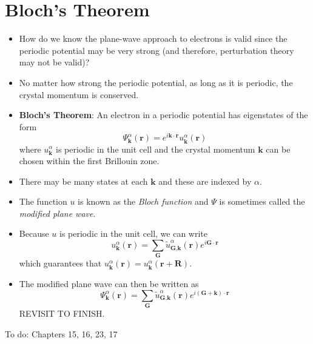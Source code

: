 \documentclass[10pt]{article}
\begin{document}
\section{Bloch's Theorem}
\begin{itemize}
  \item How do we know the plane-wave approach to electrons is valid since the periodic potential may be very strong (and
  therefore, perturbation theory may not be valid)?
  \item No matter how strong the periodic potential, as long as it is periodic, the crystal momentum is conserved.
  \item  \textbf{Bloch's Theorem}: An electron in a periodic potential has eigenstates of the form
  $$\Psi_{\textbf{k}}^{\alpha}(\textbf{r}) = e^{i\textbf{k}\cdot\textbf{r}}u_{\textbf{k}}^{\alpha}(\textbf{r})$$
  where $u_{\textbf{k}}^{\alpha}$ is periodic in the unit cell and the crystal momentum $\textbf{k}$ can be chosen
  within the first Brillouin zone.
  \item There may be many states at each $\textbf{k}$ and these are indexed by $\alpha$.
  \item The function $u$ is known as the \emph{Bloch function} and $\Psi$ is sometimes called the \emph{modified plane wave}.
  \item Because $u$ is periodic in the unit cell, we can write
  $$
  u_{\textbf{k}}^{\alpha}(\textbf{r}) = \sum_{\textbf{G}} \tilde{u}_{\textbf{G},\textbf{k}}^{\alpha}(\textbf{r})e^{i\textbf{G}\cdot\textbf{r}}
  $$
  which guarantees that $u_{\textbf{k}}^{\alpha}(\textbf{r}) = u_{\textbf{k}}^{\alpha}(\textbf{r} + \textbf{R})$.
  \item The modified plane wave can then be written as
  $$\Psi_{\textbf{k}}^{\alpha}(\textbf{r}) = \sum_{\textbf{G}} \tilde{u}_{\textbf{G},\textbf{k}}^{\alpha}(\textbf{r})e^{i(\textbf{G}+\textbf{k})\cdot\textbf{r}}$$
  REVISIT TO FINISH.
\end{itemize}
To do: Chapters 15, 16, 23, 17
\end{document}
